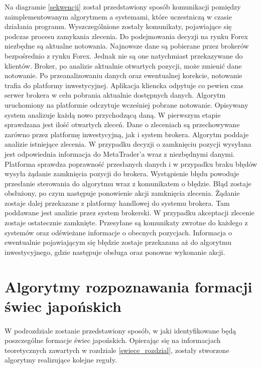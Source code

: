 \documentclass[pdflatex,11pt]{aghdpl}
\begin{document}
Na diagramie \ref{sekwencji} został przedstawiony sposób komunikacji pomiędzy zaimplementowanym algorytmem a systemami, które uczestniczą w czasie działania programu. Wyszczególnione zostały komunikaty, pojawiające się podczas procesu zamykania zlecenia. Do podejmowania decyzji na rynku Forex niezbędne są aktualne notowania. Najnowsze dane są pobierane przez brokerów bezpośrednio z rynku Forex. Jednak nie są one natychmiast przekazywane do klientów. Broker, po analizie aktualnie otwartych pozycji, może zmienić dane notowanie. Po przeanalizowaniu danych oraz ewentualnej korekcie, notowanie trafia do platformy inwestycyjnej. Aplikacja kliencka odpytuje co pewien czas serwer brokera w celu pobrania aktualnie dostępnych danych. Algorytm uruchomiony na platformie odczytuje wcześniej pobrane notowanie. Opisywany system analizuje każdą nowo przychodzącą daną. W pierwszym etapie sprawdzana jest ilość otwartych zleceń. Dane o zleceniach są przechowywane zarówno przez platformę inwestycyjną, jak i system brokera. Algorytm poddaje analizie istniejące zlecenia. W przypadku decyzji o zamknięciu pozycji wysyłana jest odpowiednia informacja do MetaTrader'a wraz z niezbędnymi danymi. Platforma sprawdza poprawność przesłanych danych i w przypadku braku błędów wysyła żądanie zamknięcia pozycji do brokera. Wystąpienie błędu powoduje przesłanie sterowania do algorytmu wraz z komunikatem o błędzie. Błąd zostaje obsłużony, po czym następuje ponowienie akcji zamknięcia zlecenia. Żądanie zostaje dalej przekazane z platformy handlowej do systemu brokera. Tam poddawane jest analizie przez system brokerski. W przypadku akceptacji zlecenie zostaje ostatecznie zamknięte. Przesyłane są komunikaty zwrotne do każdego z systemów oraz odświeżane informacje o obecnych pozycjach. Informacja o ewentualnie pojawiającym się błędzie zostaje przekazana aż do algorytmu inwestycyjnego, gdzie następuje obsługa oraz ponowne wykonanie akcji.

\section{Algorytmy rozpoznawania formacji świec japońskich}
\paragraph{}

W podrozdziale zostanie przedstawiony sposób, w jaki identyfikowane będą poszczególne formacje świec japońskich. Opierając się na informacjach teoretycznych zawartych w rozdziale \ref{swiece_rozdzial}, zostały stworzone algorytmy realizujące kolejne reguły. 
\end{document}
